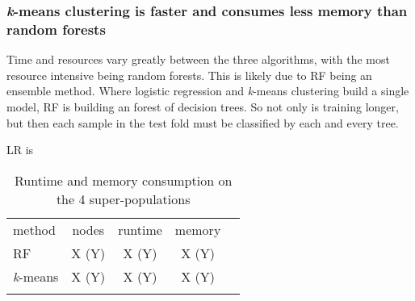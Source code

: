 \documentclass{llncs}
\newcommand{\kMeans}{\textit{k}-means }
\begin{document}
{\subsubsection{\kMeans{} clustering is faster and consumes less memory than random forests}

Time and resources vary greatly between the three algorithms, with the most resource intensive being random forests.
This is likely due to RF being an ensemble method. Where logistic regression and \kMeans{} clustering build a single model,
RF is building an forest of decision trees. So not only is training longer, but then each sample in the test fold must be classified by each and every tree.

LR is 





\begin{table}
\caption{Runtime and memory consumption on the 4 super-populations}
\begin{center}
\renewcommand{\arraystretch}{1.4}
\setlength\tabcolsep{3pt}
\begin{tabular}{lcccc}
\hline\noalign{\smallskip}
method  & nodes & runtime & memory \\
RF  & X (Y) & X (Y) & X (Y) \\
\kMeans & X (Y) & X (Y) & X (Y) \\
\noalign{\smallskip}
\hline
\end{tabular}
\end{center}
\end{table}




}
\end{document}
